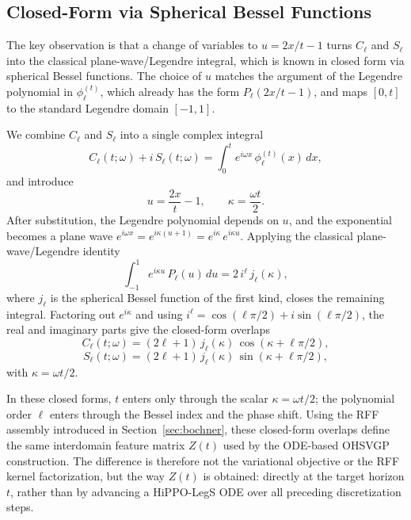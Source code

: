 \documentclass{article}
\theoremstyle{plain}
\theoremstyle{definition}
\theoremstyle{remark}
\begin{document}
\subsection{Closed-Form via Spherical Bessel Functions}
\label{sec:closed-form}

The key observation is that a change of variables to $u = 2x/t - 1$ turns $C_\ell$ and $S_\ell$ into the classical plane-wave/Legendre integral, which is known in closed form via spherical Bessel functions. The choice of $u$ matches the argument of the Legendre polynomial in $\phi_\ell^{(t)}$, which already has the form $P_\ell(2x/t - 1)$, and maps $[0,t]$ to the standard Legendre domain $[-1,1]$.

We combine $C_\ell$ and $S_\ell$ into a single complex integral
\begin{equation}
C_\ell(t;\omega) + i\,S_\ell(t;\omega) = \int_0^t e^{i\omega x}\,\phi_\ell^{(t)}(x)\,dx,
\end{equation}
and introduce
\begin{equation}
u = \frac{2x}{t}-1,\qquad \kappa = \frac{\omega t}{2}.
\end{equation}
After substitution, the Legendre polynomial depends on $u$, and the exponential becomes a plane wave $e^{i\omega x} = e^{i\kappa(u+1)} = e^{i\kappa}\,e^{i\kappa u}$. Applying the classical plane-wave/Legendre identity~\citep{DLMF}
\begin{equation}
\int_{-1}^1 e^{i\kappa u}\,P_\ell(u)\,du = 2\,i^\ell\,j_\ell(\kappa),
\end{equation}
where $j_\ell$ is the spherical Bessel function of the first kind, closes the remaining integral. Factoring out $e^{i\kappa}$ and using $i^\ell = \cos(\ell\pi/2) + i\sin(\ell\pi/2)$, the real and imaginary parts give the closed-form overlaps
\begin{equation}
\label{eq:C-closed}
C_\ell(t;\omega) = (2\ell+1)\,j_\ell(\kappa)\,\cos(\kappa+\ell\pi/2),
\end{equation}
\begin{equation}
\label{eq:S-closed}
S_\ell(t;\omega) = (2\ell+1)\,j_\ell(\kappa)\,\sin(\kappa+\ell\pi/2),
\end{equation}
with $\kappa = \omega t/2$.

In these closed forms, $t$ enters only through the scalar $\kappa = \omega t/2$; the polynomial order $\ell$ enters through the Bessel index and the phase shift. Using the RFF assembly introduced in Section~\ref{sec:bochner}, these closed-form overlaps define the same interdomain feature matrix $Z(t)$ used by the ODE-based OHSVGP construction. The difference is therefore not the variational objective or the RFF kernel factorization, but the way $Z(t)$ is obtained: directly at the target horizon $t$, rather than by advancing a HiPPO-LegS ODE over all preceding discretization steps.
\end{document}
